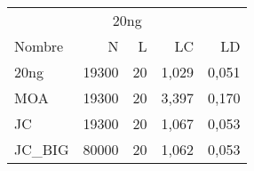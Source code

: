 \begin{tabular}{lrrrr}
	\toprule
	\multicolumn{5}{c}{20ng}             \\
	Nombre  & N     & L  & LC    & LD    \\
	\midrule
	20ng    & 19300 & 20 & 1,029 & 0,051 \\
	MOA     & 19300 & 20 & 3,397 & 0,170 \\
	JC      & 19300 & 20 & 1,067 & 0,053 \\
	JC\_BIG & 80000 & 20 & 1,062 & 0,053 \\
	\bottomrule
\end{tabular}
